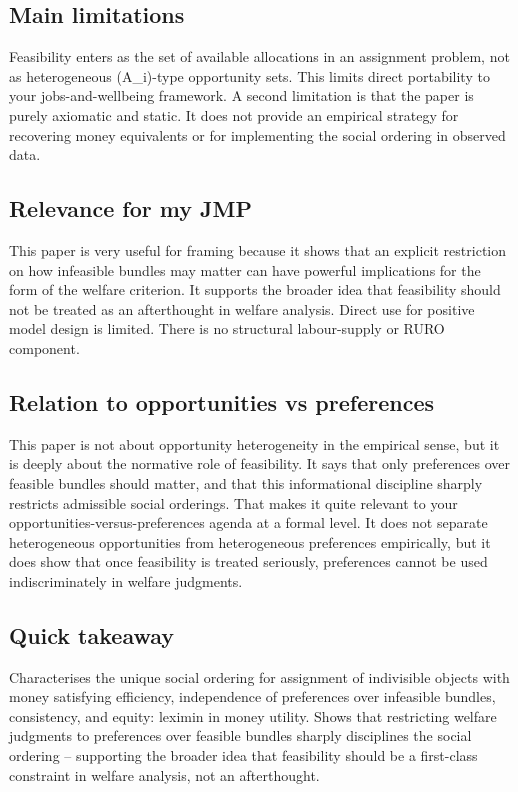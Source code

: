 \documentclass[11pt,a4paper]{article}
\begin{document}
\subsection*{Main limitations}
Feasibility enters as the set of available allocations in an assignment problem, not as heterogeneous (A\_i)-type opportunity sets. This limits direct portability to your jobs-and-wellbeing framework. A second limitation is that the paper is purely axiomatic and static. It does not provide an empirical strategy for recovering money equivalents or for implementing the social ordering in observed data.

\subsection*{Relevance for my JMP}
This paper is very useful for framing because it shows that an explicit restriction on how infeasible bundles may matter can have powerful implications for the form of the welfare criterion. It supports the broader idea that feasibility should not be treated as an afterthought in welfare analysis. Direct use for positive model design is limited. There is no structural labour-supply or RURO component.

\subsection*{Relation to opportunities vs preferences}
This paper is not about opportunity heterogeneity in the empirical sense, but it is deeply about the normative role of feasibility. It says that only preferences over feasible bundles should matter, and that this informational discipline sharply restricts admissible social orderings. That makes it quite relevant to your opportunities-versus-preferences agenda at a formal level. It does not separate heterogeneous opportunities from heterogeneous preferences empirically, but it does show that once feasibility is treated seriously, preferences cannot be used indiscriminately in welfare judgments.

\subsection*{Quick takeaway}
Characterises the unique social ordering for assignment of indivisible objects with money satisfying efficiency, independence of preferences over infeasible bundles, consistency, and equity: leximin in money utility. Shows that restricting welfare judgments to preferences over feasible bundles sharply disciplines the social ordering -- supporting the broader idea that feasibility should be a first-class constraint in welfare analysis, not an afterthought.
\end{document}
